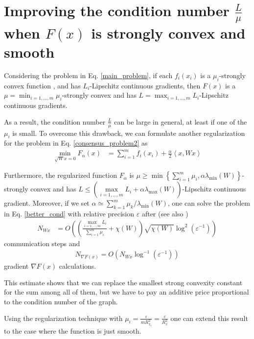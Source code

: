 \documentclass[final]{siamart1116}
\numberwithin{theorem}{section}
\begin{document}
	\section{Improving the condition number $\frac{L}{\mu}$ when $F(x)$ is strongly convex and smooth}\label{sec:condition}
	
	Considering the problem in Eq. \eqref{main_problem}, if each $f_i(x_i)$ is a $\mu_i$-strongly convex function , and has $L_i$-Lipschitz continuous gradients, then $F(x) $ is a \mbox{$\mu = \min_{i=1,\hdots,m}\mu_i$-strongly} convex and has $L = \max_{i=1,\hdots,m}L_i$-Lipschitz continuous gradients.
	
	As a result, the condition number $\frac{L}{\mu}$ can be large in general, at least if one of the $\mu_i$ is small. To overcome this drawback, we can formulate another regularization for the problem in Eq. \eqref{consensus_problem2} as
	\begin{align}\label{better_cond}
	\min_{\sqrt{W} x=0} F_\alpha (x) & = \sum\limits_{i=1}^{m}f_i(x_i) + \frac{\alpha}{2}\left\langle x,Wx\right\rangle
	\end{align}
	
	Furthermore, the regularized function $F_\alpha$ is $\mu \geq \min \left\lbrace \sum\limits_{i=1}^{m}\mu_i,\alpha \lambda_{\min}(W)\right\rbrace $-strongly convex and has \mbox{$L \leq  \left( \max\limits_{i=1,\hdots,m}L_i + \alpha \lambda_{\max}(W)\right) $-Lipschitz} continuous gradient. Moreover, if we set \mbox{$\alpha \simeq
		\sum\limits_{k=1}^{m}\mu_k / \lambda_{\min}(W)$}, one can solve the problem in Eq. \eqref{better_cond} with relative precision $\varepsilon$ after (see also \cite{ned16w})
	\begin{align*}
	N_{Wx} & =O\left(  \left( \frac{\max\limits_{i=1,\hdots,m}L_i}{\sum\limits_{i=1}^{m}\mu_i} + \chi(W)\right) \sqrt{\chi(W)} \log^2(\varepsilon^{-1})\right) 
	\end{align*}
	communication steps and
	\begin{align*}
	N_{\nabla F(x)} = O\left( N_{Wx}   \log^{-1}(\varepsilon^{-1})\right) 
	\end{align*}
	gradient $\nabla F(x)$ calculations.
	
	This estimate shows that we can replace the smallest strong convexity constant for the sum among all of them, but we have to pay an additive price proportional to the condition number of the graph.
	
	Using the regularization technique with $\mu_i = \frac{\varepsilon}{mR^2_{x_i}} = \frac{\varepsilon}{R^2_x}$ one can extend this result to the case where the function is just smooth.
	
\end{document}
